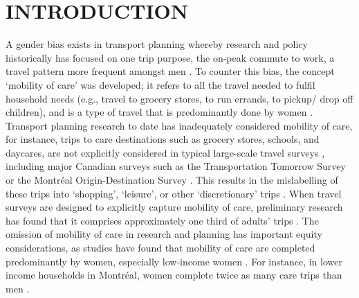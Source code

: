 \documentclass[
  super,
  preprint,
  3p]{elsarticle}
\begin{document}
\hypertarget{introduction}{%
\section{INTRODUCTION}\label{introduction}}

A gender bias exists in transport planning whereby research and policy
historically has focused on one trip purpose, the on-peak commute to
work, a travel pattern more frequent amongst men
\citep{sanchezdemadariagaMobilityCareIntroducing2013}. To counter this
bias, the concept `mobility of care' was developed; it refers to all the
travel needed to fulfil household needs (e.g., travel to grocery stores,
to run errands, to pickup/ drop off children), and is a type of travel
that is predominantly done by women
\citep{sanchezdemadariagaMobilityCareIntroducing2013, sanchezdemadariagaMeasuringMobilitiesCare2019}.
Transport planning research to date has inadequately considered mobility
of care, for instance, trips to care destinations such as grocery
stores, schools, and daycares, are not explicitly considered in typical
large-scale travel surveys
\citep{sanchezdemadariagaMobilityCareIntroducing2013}, including major
Canadian surveys such as the Transportation Tomorrow Survey
\citep{transportationtomorrowsurveyTransportationTomorrwoSurvey2022} or
the Montréal Origin-Destination Survey
\citep{autoriteregionaldetransportmetropolitainEnqueteOrigineDestination20182022}.
This results in the mislabelling of these trips into `shopping',
`leisure', or other `discretionary' trips
\citep{sanchezdemadariagaMobilityCareIntroducing2013, transportationtomorrowsurveyTransportationTomorrwoSurvey2022}.
When travel surveys are designed to explicitly capture mobility of care,
preliminary research has found that it comprises approximately one third
of adults' trips
\citep{sanchezdemadariagaMobilityCareIntroducing2013, sanchezdemadariagaMeasuringMobilitiesCare2019, mcdonaldExploratoryAnalysisChildren2006}.
The omission of mobility of care in research and planning has important
equity considerations, as studies have found that mobility of care are
completed predominantly by women, especially low-income women
\citep{sanchezdemadariagaMobilityCareIntroducing2013, ravensbergenExploratoryAnalysisMobility2022}.
For instance, in lower income households in Montréal, women complete
twice as many care trips than men
\citep{ravensbergenExploratoryAnalysisMobility2022}.
\end{document}
